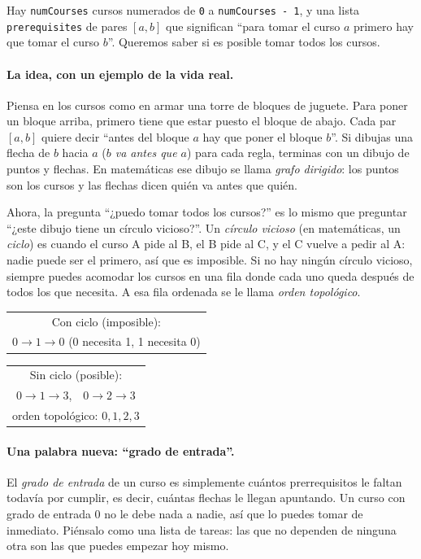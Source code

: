
Hay \texttt{numCourses} cursos numerados de \texttt{0} a
\texttt{numCourses - 1}, y una lista \texttt{prerequisites} de pares
$[a, b]$ que significan ``para tomar el curso $a$ primero hay que tomar el
curso $b$''. Queremos saber si es posible tomar todos los cursos.

\paragraph{La idea, con un ejemplo de la vida real.} Piensa en los cursos como
en armar una torre de bloques de juguete. Para poner un bloque arriba, primero
tiene que estar puesto el bloque de abajo. Cada par $[a, b]$ quiere decir
``antes del bloque $a$ hay que poner el bloque $b$''. Si dibujas una flecha de
$b$ hacia $a$ (\emph{$b$ va antes que $a$}) para cada regla, terminas con un
dibujo de puntos y flechas. En matemáticas ese dibujo se llama \emph{grafo
dirigido}: los puntos son los cursos y las flechas dicen quién va antes que
quién.

Ahora, la pregunta ``¿puedo tomar todos los cursos?'' es lo mismo que
preguntar ``¿este dibujo tiene un círculo vicioso?''. Un \emph{círculo vicioso}
(en matemáticas, un \emph{ciclo}) es cuando el curso A pide al B, el B pide al
C, y el C vuelve a pedir al A: nadie puede ser el primero, así que es imposible.
Si no hay ningún círculo vicioso, siempre puedes acomodar los cursos en una
fila donde cada uno queda después de todos los que necesita. A esa fila
ordenada se le llama \emph{orden topológico}.

\begin{center}
\ttfamily
\begin{tabular}{c}
Con ciclo (imposible):\\[4pt]
$0 \rightarrow 1 \rightarrow 0$ \quad (0 necesita 1, 1 necesita 0)
\end{tabular}
\qquad
\begin{tabular}{c}
Sin ciclo (posible):\\[4pt]
$0 \rightarrow 1 \rightarrow 3$,\ \ $0 \rightarrow 2 \rightarrow 3$\\
orden topológico: $0, 1, 2, 3$
\end{tabular}
\end{center}

\paragraph{Una palabra nueva: ``grado de entrada''.} El \emph{grado de entrada}
de un curso es simplemente cuántos prerrequisitos le faltan todavía por
cumplir, es decir, cuántas flechas le llegan apuntando. Un curso con grado de
entrada $0$ no le debe nada a nadie, así que lo puedes tomar de inmediato.
Piénsalo como una lista de tareas: las que no dependen de ninguna otra son las
que puedes empezar hoy mismo.

